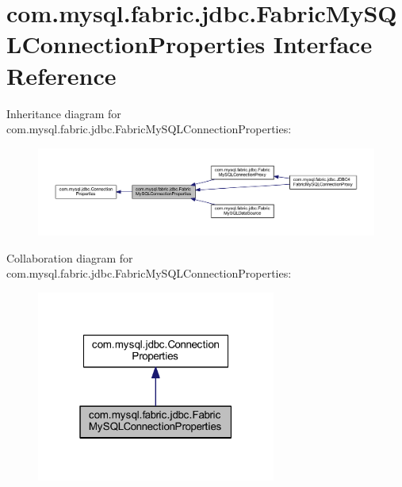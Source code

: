 \hypertarget{interfacecom_1_1mysql_1_1fabric_1_1jdbc_1_1_fabric_my_s_q_l_connection_properties}{}\section{com.\+mysql.\+fabric.\+jdbc.\+Fabric\+My\+S\+Q\+L\+Connection\+Properties Interface Reference}
\label{interfacecom_1_1mysql_1_1fabric_1_1jdbc_1_1_fabric_my_s_q_l_connection_properties}


Inheritance diagram for com.\+mysql.\+fabric.\+jdbc.\+Fabric\+My\+S\+Q\+L\+Connection\+Properties\+:\nopagebreak
\begin{figure}[H]
\begin{center}
\leavevmode
\includegraphics[width=350pt]{interfacecom_1_1mysql_1_1fabric_1_1jdbc_1_1_fabric_my_s_q_l_connection_properties__inherit__graph}
\end{center}
\end{figure}


Collaboration diagram for com.\+mysql.\+fabric.\+jdbc.\+Fabric\+My\+S\+Q\+L\+Connection\+Properties\+:\nopagebreak
\begin{figure}[H]
\begin{center}
\leavevmode
\includegraphics[width=223pt]{interfacecom_1_1mysql_1_1fabric_1_1jdbc_1_1_fabric_my_s_q_l_connection_properties__coll__graph}
\end{center}
\end{figure}
